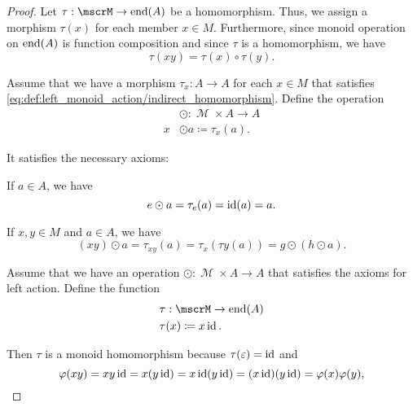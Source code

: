 \begin{proof}
   Let \( \tau: \mscrM \to \End(A) \) be a homomorphism. Thus, we assign a morphism \( \tau(x) \) for each member \( x \in M \). Furthermore, since monoid operation on \( \operatorname{end}(A) \) is function composition and since \( \tau \) is a homomorphism, we have
  \begin{equation*}
    \tau(xy) = \tau(x) \circ \tau(y).
  \end{equation*}

   Assume that we have a morphism \( \tau_x: A \to A \) for each \( x \in M \) that satisfies \eqref{eq:def:left_monoid_action/indirect_homomorphism}. Define the operation
  \begin{align*}
    {}&\odot{}: \mscrM \times A \to A \\
    x &\odot a \coloneqq \tau_x(a).
  \end{align*}

  It satisfies the necessary axioms:
  \begin{refenum}
     If \( a \in A \), we have
    \begin{equation*}
      e \odot a
      =
      \tau_e(a)
      =
      \operatorname{id}(a)
      =
      a.
    \end{equation*}

     If \( x, y \in M \) and \( a \in A \), we have
    \begin{equation*}
      (x y) \odot a
      =
      \tau_{x y}(a)
      =
      \tau_{x}(\tau{y}(a))
      =
      g \odot (h \odot a).
    \end{equation*}
  \end{refenum}

   Assume that we have an operation \( \odot: \mscrM \times A \to A \) that satisfies the axioms for left action. Define the function
  \begin{align*}
    &\tau: \mscrM \to \End(A) \\
    &\tau(x) \coloneqq x \id.
  \end{align*}

  Then \( \tau \) is a monoid homomorphism because \( \tau(\varepsilon) = \operatorname{id} \) and
  \begin{equation}\label{def:left_monoid_action/homomorphism/proof}
    \varphi(xy)
    =
    xy \operatorname{id}
    =
    x (y \operatorname{id})
    =
    x \operatorname{id} (y \operatorname{id})
    =
    (x \operatorname{id}) (y \operatorname{id})
    =
    \varphi(x) \varphi(y),
  \end{equation}
\end{proof}

